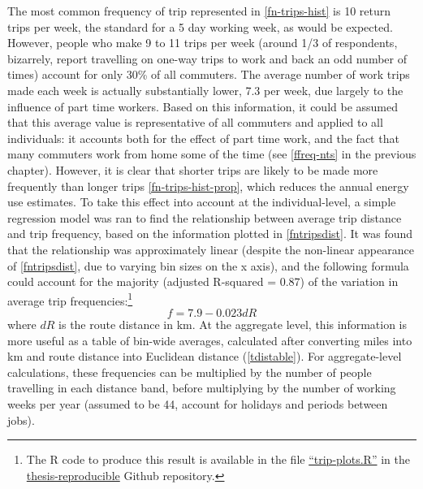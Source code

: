 The most common frequency of trip represented in \cref{fn-trips-hist} is 10
return trips per week, the standard for a 5 day working week, as would be
expected. However, people who make 9 to 11 trips per week (around 1/3 of
respondents, bizarrely, report travelling on one-way trips to work and back
an odd number of times) account for only 30\% of all commuters.
The average number of work trips made each week is actually substantially
lower, 7.3 per week, due largely to the influence of part time workers.
Based on this information, it could be assumed that this average value is
representative
of all commuters and applied to all individuals: it accounts both for the
effect of part time work, and the fact that many commuters work from home
some of the time (see \cref{ffreq-nts} in the previous chapter).
However, it is clear that
shorter trips are likely to be made more frequently than longer trips
\cref{fn-trips-hist-prop}, which reduces the annual energy use estimates.
To take this effect into account at the individual-level, a simple
regression model was ran to find the relationship between average trip
distance and trip frequency, based on the information plotted in
\cref{fntripsdist}. It was found that the relationship was
approximately linear (despite the non-linear appearance
of \cref{fntripsdist}, due to varying bin sizes on the x axis),
and the following formula could account for the majority
(adjusted R-squared =  0.87) of the variation in
average trip frequencies:\footnote{The
R code to produce this result is available in the file
{\color{blue} \href{https://github.com/Robinlovelace/thesis-reproducible/blob/master/trip-plots.R}
{``trip-plots.R''}}
in the {\color{blue} \href{https://github.com/Robinlovelace/thesis-reproducible}
{thesis-reproducible}} Github repository.
}
\begin{equation}
 f = 7.9 - 0.023 dR
\end{equation}
where $dR$ is the route distance in km.
At the aggregate level, this information is more useful as a table of
bin-wide averages, calculated after converting miles into km and route distance into
Euclidean distance (\cref{tdistable}). For aggregate-level calculations,
these frequencies can be multiplied by the number of people travelling
in each distance band, before multiplying by the number of working weeks
per year (assumed to be 44, account
for holidays and periods between jobs).


